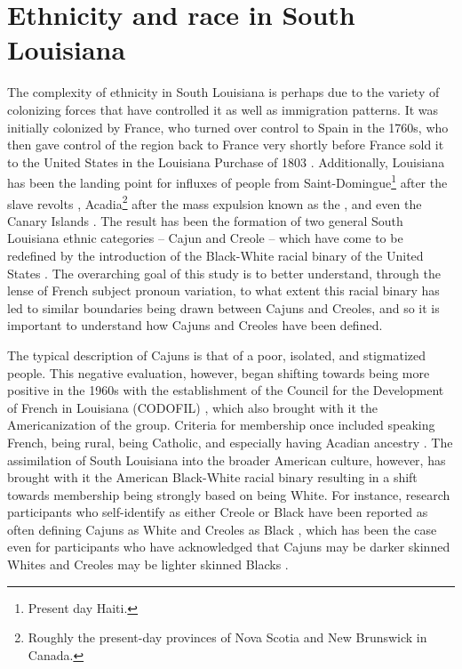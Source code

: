   \section{Ethnicity and race in South Louisiana}
    \label{sec:ethnicity_race}
    The complexity of ethnicity in South Louisiana is perhaps due to the variety of colonizing forces that have controlled it as well as immigration patterns.
    It was initially colonized by France, who turned over control to Spain in the 1760s, who then gave control of the region back to France very shortly before France sold it to the United States in the Louisiana Purchase of 1803 \parencite{fortier_french_1884, johnson_louisiana_1976, klingler_if_2003}.
    Additionally, Louisiana has been the landing point for influxes of people from Saint-Domingue\footnote{
      Present day Haiti.
    } after the slave revolts \parencite[Debien \& Le Gardeur, 1981, as cited in][]{klingler_if_2003}, Acadia\footnote{
      Roughly the present-day provinces of Nova Scotia and New Brunswick in Canada.
    } after the mass expulsion known as the  \parencite{fortier_french_1884, klingler_if_2003, neumann_creole_1985}, and even the Canary Islands \parencite{klingler_if_2003}.
    The result has been the formation of two general South Louisiana ethnic categories -- Cajun and Creole -- which have come to be redefined by the introduction of the Black-White racial binary of the United States \parencite{dajko_sociolinguistics_2012}.
    The overarching goal of this study is to better understand, through the lense of French subject pronoun variation, to what extent this racial binary has led to similar boundaries being drawn between Cajuns and Creoles, and so it is important to understand how Cajuns and Creoles have been defined.

      The typical description of Cajuns is that of a poor, isolated, and stigmatized people.
      This negative evaluation, however, began shifting towards being more positive in the 1960s with the establishment of the Council for the Development of French in Louisiana (CODOFIL) \parencite[pp.~31-33]{brown_pronominal_1988}, which also brought with it the Americanization of the group.
      Criteria for membership once included speaking French, being rural, being Catholic, and especially having Acadian ancestry \parencite{johnson_louisiana_1976, neumann_creole_1985, smith_influence_1939}.
      The assimilation of South Louisiana into the broader American culture, however, has brought with it the American Black-White racial binary resulting in a shift towards membership being strongly based on being White.
      For instance, research participants who self-identify as either Creole or Black have been reported as often defining Cajuns as White and Creoles as Black \parencite[p.~34]{giancarlo_dont_2019}, which has been the case even for participants who have acknowledged that Cajuns may be darker skinned Whites and Creoles may be lighter skinned Blacks \parencite[Stanford, 2016, as cited in][p.~32]{giancarlo_dont_2019}.

